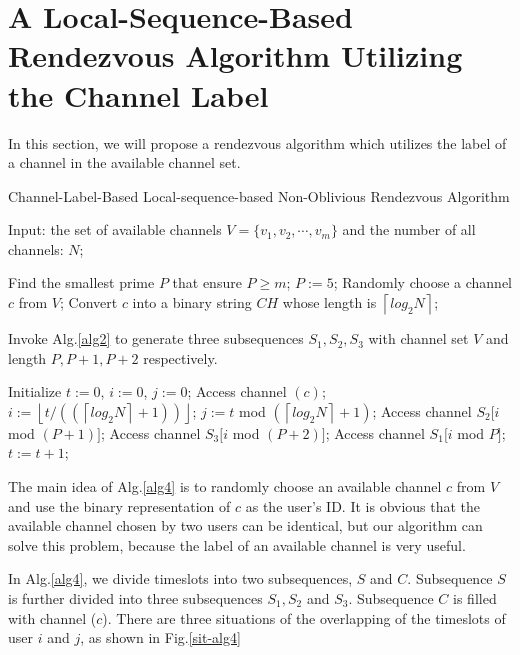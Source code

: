 \documentclass[10pt, conference, letterpaper]{IEEEtran}
\begin{document}
\section{A Local-Sequence-Based Rendezvous Algorithm Utilizing the Channel Label}
In this section, we will propose a rendezvous algorithm which utilizes the label of a channel in the available channel set.
\begin{algorithm}
\caption{Channel-Label-Based Local-sequence-based Non-Oblivious Rendezvous Algorithm}
\label{alg4}
\begin{algorithmic}[1]
\STATE Input: the set of available channels $V=\{v_1,v_2,\cdots,v_m\}$ and the number of all channels: $N$;

\STATE Find the smallest prime $P$ that ensure $P \ge m$;
\STATE $P := 5$;
\ENDIF
\STATE Randomly choose a channel $c$ from $V$;
\STATE Convert $c$ into a binary string $CH$ whose length is $\left \lceil log_2 N \right \rceil$;

\STATE Invoke Alg.\ref{alg2} to generate three subsequences $S_1, S_2, S_3$ with channel set $V$ and length $P, P+1, P+2$ respectively.

\STATE Initialize $t := 0$, $i := 0$, $j:=0$;
\STATE Access channel $(c)$;
\ELSE
 \STATE $i := \left \lfloor t / ((\left \lceil log_2 N \right \rceil +1)) \right \rfloor$;
 \STATE $j :=  t$ mod $ (\left \lceil log_2 N \right \rceil + 1)$;
     \STATE Access channel $S_2[i $ mod $ (P+1)]$;
      \ELSE
     \STATE Access channel $S_3[i $ mod $ (P+2)]$;
     \ENDIF
  \ELSE
\STATE Access channel $S_1[i $ mod $ P]$;
\ENDIF
\ENDIF
\STATE $t:=t+1$;
\ENDWHILE
\end{algorithmic}
\end{algorithm}

The main idea of Alg.\ref{alg4} is to randomly choose an available channel $c$ from $V$ and use the binary representation of $c$ as the user's ID. It is obvious that the available channel chosen by two users can be identical, but our algorithm can solve this problem, because the label of an available channel is very useful.



In Alg.\ref{alg4}, we divide timeslots into two subsequences, $S$ and $C$. Subsequence $S$ is further divided into three subsequences $S_1,S_2$ and $S_3$. Subsequence $C$ is filled with channel ($c$). There are three situations of the overlapping of the timeslots of user $i$ and $j$, as shown in Fig.\ref{sit-alg4}
\end{document}
